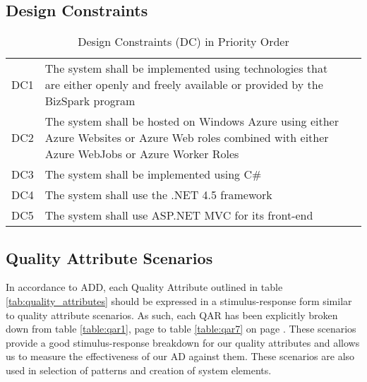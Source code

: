 \subsection{Design Constraints}
\begin{table}[!h]
\centering
\begin{tabularx}{\linewidth}{|l|X|l}
\cline{1-2}
DC1 & The system shall be implemented using technologies that are either openly and freely available or provided by the BizSpark program &   \\
DC2 & The system shall be hosted on Windows Azure using either Azure Websites or Azure Web roles combined with either Azure WebJobs or Azure Worker Roles &  \\
DC3 & The system shall be implemented using C\# &    \\
DC4 & The system  shall use the .NET 4.5 framework    \\
DC5 & The system shall use ASP.NET \index{ASP.NET} MVC for its front-end &    \\
\cline{1-2}
\end{tabularx}
\caption{Design Constraints (DC) in Priority Order}
\label{tab:design_constraints}
\end{table}


\subsection{Quality Attribute Scenarios}
In accordance to ADD, each Quality Attribute outlined in table \ref{tab:quality_attributes} should be expressed in a stimulus-response form similar to quality attribute scenarios. As such, each QAR has been explicitly broken down from table \ref{table:qar1}, page \pageref{table:qar1} to table \ref{table:qar7} on page \pageref{table:qar7}. These scenarios provide a good stimulus-response breakdown for our quality attributes and allows us to measure the effectiveness of our AD against them. These scenarios are also used in selection of patterns and creation of system elements.

